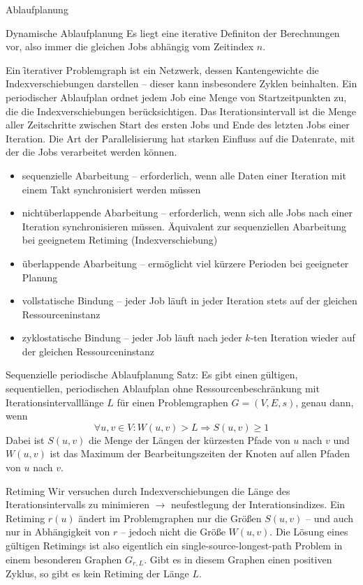 \begin{chapter}{Ablaufplanung}
  \begin{section}{Dynamische Ablaufplanung}
   Es liegt eine iterative Definiton der Berechnungen vor, also immer die gleichen Jobs abhängig vom Zeitindex $n$.
   
   Ein \f{iterativer Problemgraph} ist ein Netzwerk, dessen Kantengewichte die Indexverschiebungen darstellen -- dieser kann insbesondere Zyklen beinhalten. Ein periodischer Ablaufplan ordnet jedem Job eine Menge von Startzeitpunkten zu, die die Indexverschiebungen berücksichtigen. Das Iterationsintervall ist die Menge aller Zeitschritte zwischen Start des ersten Jobs und Ende des letzten Jobs einer Iteration. Die Art der \f{Parallelisierung} hat starken Einfluss auf die Datenrate, mit der die Jobs verarbeitet werden können.
   \begin{itemize}
    \item sequenzielle Abarbeitung -- erforderlich, wenn alle Daten einer Iteration mit einem Takt synchronisiert werden müssen
    \item nichtüberlappende Abarbeitung -- erforderlich, wenn sich alle Jobs nach einer Iteration synchronisieren müssen. Äquivalent zur sequenziellen Abarbeitung bei geeignetem Retiming (Indexverschiebung)
    \item überlappende Abarbeitung -- ermöglicht viel kürzere Perioden bei geeigneter Planung
   \end{itemize}
   
   \begin{itemize}
    \item vollstatische Bindung -- jeder Job läuft in jeder Iteration stets auf der gleichen Ressourceninstanz
    \item zyklostatische Bindung -- jeder Job läuft nach jeder $k$-ten Iteration wieder auf der gleichen Ressourceninstanz
   \end{itemize}
   
   \begin{subsection}{Sequenzielle periodische Ablaufplanung}
    \f{Satz:} Es gibt einen gültigen, sequentiellen, periodischen Ablaufplan ohne Ressourcenbeschränkung mit Iterationsintervalllänge $L$ für einen Problemgraphen $G=(V,E,s)$, genau dann, wenn
    \[ \forall u,v\in V: W(u,v)>L \Rightarrow S(u,v) \geq 1 \]
    Dabei ist $S(u,v)$ die Menge der Längen der kürzesten Pfade von $u$ nach $v$ und $W(u,v)$ ist das Maximum der Bearbeitungszeiten der Knoten auf allen Pfaden von $u$ nach $v$.
   \end{subsection}
   
   \begin{subsection}{Retiming}
    Wir versuchen durch Indexverschiebungen die Länge des Iterationsintervalls zu minimieren $\rightarrow$ neufestlegung der Interationsindizes. Ein Retiming $r(u)$ ändert im Problemgraphen nur die Größen $S(u,v)$ -- und auch nur in Abhängigkeit von $r$ -- jedoch nicht die Größe $W(u,v)$. Die Lösung eines gültigen Retimings ist also eigentlich ein single-source-longest-path Problem in einem besonderen Graphen $G_{r,L}$. Gibt es in diesem Graphen einen positiven Zyklus, so gibt es kein Retiming der Länge $L$.
    

\end{subsection}
\end{section}
\end{chapter}
